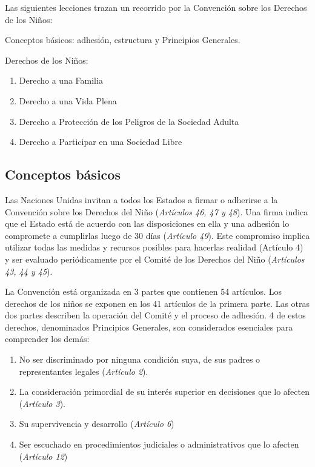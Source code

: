 \documentclass{tufte-handout}
\begin{document}
Las siguientes lecciones trazan un recorrido por la Convención sobre los Derechos de los Niños:

Conceptos básicos: adhesión, estructura y Principios Generales.

Derechos de los Niños:

\begin{enumerate}
\item{Derecho a una Familia}
\item{Derecho a una Vida Plena}
\item{Derecho a Protección de los Peligros de la Sociedad Adulta}
\item{Derecho a Participar en una Sociedad Libre}
\end{enumerate}

\subsection{Conceptos básicos}\label{subsec:conceptos}


Las Naciones Unidas invitan a todos los Estados a firmar o adherirse a la Convención sobre los Derechos del Niño (\textit{Artículos 46, 47 y 48}). Una firma indica que el Estado está de acuerdo con las disposiciones en ella y una adhesión lo compromete a cumplirlas luego de 30 días (\textit{Artículo 49}). Este compromiso implica utilizar todas las medidas y recursos posibles para hacerlas realidad (Artículo 4) y ser evaluado periódicamente por el Comité de los Derechos del Niño (\textit{Artículos 43, 44 y 45}).

La Convención está organizada en 3 partes que contienen 54 artículos. Los derechos de los niños se exponen en los 41 artículos de la primera parte. Las otras dos partes describen la operación del Comité y el proceso de adhesión. 4 de estos derechos, denominados Principios Generales, son considerados esenciales para comprender los demás:

\begin{enumerate}
\item{No ser discriminado por ninguna condición suya, de sus padres o representantes legales (\textit{Artículo 2}).}
\item{La consideración primordial de su interés superior en decisiones que lo afecten (\textit{Artículo 3}).}
\item{Su supervivencia y desarrollo (\textit{Artículo 6})}
\item{Ser escuchado en procedimientos judiciales o administrativos que lo afecten (\textit{Artículo 12})}
\end{enumerate}
\end{document}
